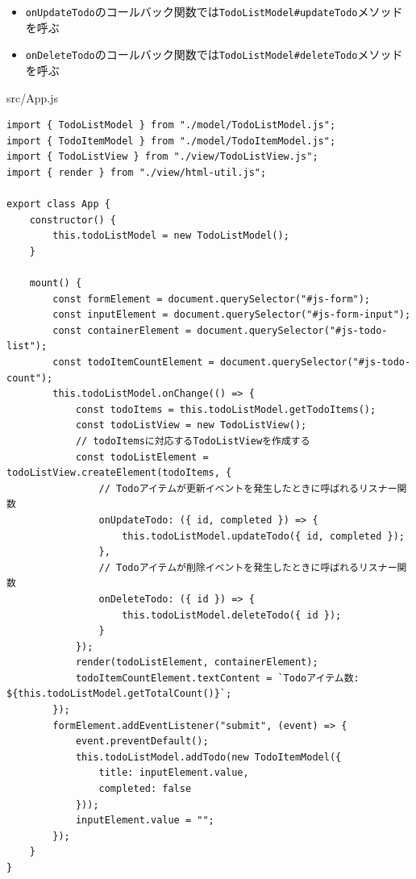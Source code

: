 \begin{itemize}
\item
  \texttt{onUpdateTodo}のコールバック関数では\texttt{TodoListModel\#updateTodo}メソッドを呼ぶ
\item
  \texttt{onDeleteTodo}のコールバック関数では\texttt{TodoListModel\#deleteTodo}メソッドを呼ぶ
\end{itemize}

\begin{listtitle}
src/App.js
\end{listtitle}
\begin{lstlisting}
import { TodoListModel } from "./model/TodoListModel.js";
import { TodoItemModel } from "./model/TodoItemModel.js";
import { TodoListView } from "./view/TodoListView.js";
import { render } from "./view/html-util.js";

export class App {
    constructor() {
        this.todoListModel = new TodoListModel();
    }

    mount() {
        const formElement = document.querySelector("#js-form");
        const inputElement = document.querySelector("#js-form-input");
        const containerElement = document.querySelector("#js-todo-list");
        const todoItemCountElement = document.querySelector("#js-todo-count");
        this.todoListModel.onChange(() => {
            const todoItems = this.todoListModel.getTodoItems();
            const todoListView = new TodoListView();
            // todoItemsに対応するTodoListViewを作成する
            const todoListElement = todoListView.createElement(todoItems, {
                // Todoアイテムが更新イベントを発生したときに呼ばれるリスナー関数
                onUpdateTodo: ({ id, completed }) => {
                    this.todoListModel.updateTodo({ id, completed });
                },
                // Todoアイテムが削除イベントを発生したときに呼ばれるリスナー関数
                onDeleteTodo: ({ id }) => {
                    this.todoListModel.deleteTodo({ id });
                }
            });
            render(todoListElement, containerElement);
            todoItemCountElement.textContent = `Todoアイテム数: ${this.todoListModel.getTotalCount()}`;
        });
        formElement.addEventListener("submit", (event) => {
            event.preventDefault();
            this.todoListModel.addTodo(new TodoItemModel({
                title: inputElement.value,
                completed: false
            }));
            inputElement.value = "";
        });
    }
}
\end{lstlisting}
\listend

